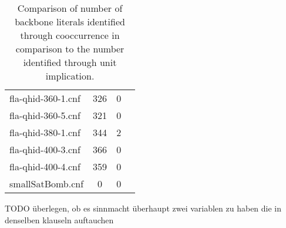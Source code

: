 \begin{table}[h!]
\begin{tabular}{l| c c c }
fla-qhid-360-1.cnf & 326 & 0 \\
fla-qhid-360-5.cnf & 321 & 0 \\
fla-qhid-380-1.cnf & 344 & 2 \\
fla-qhid-400-3.cnf & 366 & 0 \\
fla-qhid-400-4.cnf & 359 & 0 \\
smallSatBomb.cnf & 0 & 0\\
\end{tabular}
\caption{Comparison of number of backbone literals identified through cooccurrence in comparison to the number identified through unit implication.}
\end{table}


TODO überlegen, ob es sinnmacht überhaupt zwei variablen zu haben die in denselben klauseln auftauchen
